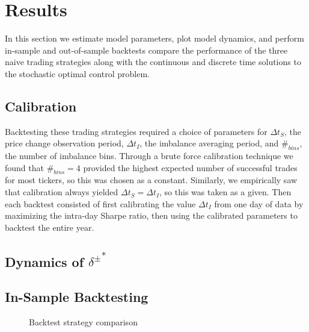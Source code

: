 \chapter{Results}
In this section we estimate model parameters, plot model dynamics, and perform in-sample and out-of-sample backtests compare the performance of the three naive trading strategies along with the continuous and discrete time solutions to the stochastic optimal control problem.

\section{Calibration}

Backtesting these trading strategies required a choice of parameters for $\Delta t_S$, the price change observation period, $\Delta t_I$, the imbalance averaging period, and $\#_{bins}$, the number of imbalance bins. Through a brute force calibration technique we found that $\#_{bins} = 4$ provided the highest expected number of successful trades for most tickers, so this was chosen as a constant. Similarly, we empirically saw that calibration always yielded $\Delta t_S = \Delta t_I$, so this was taken as a given. Then each backtest consisted of first calibrating the value $\Delta t_I$ from one day of data by maximizing the intra-day Sharpe ratio, then using the calibrated parameters to backtest the entire year.

\section{Dynamics of \texorpdfstring{${\delta^{\pm}}^*$}{delta}}

\section{In-Sample Backtesting}

\begin{figure}
  \centering
  \setlength{} 
  \setlength{}
  
  \caption{Backtest strategy comparison}
\end{figure}

